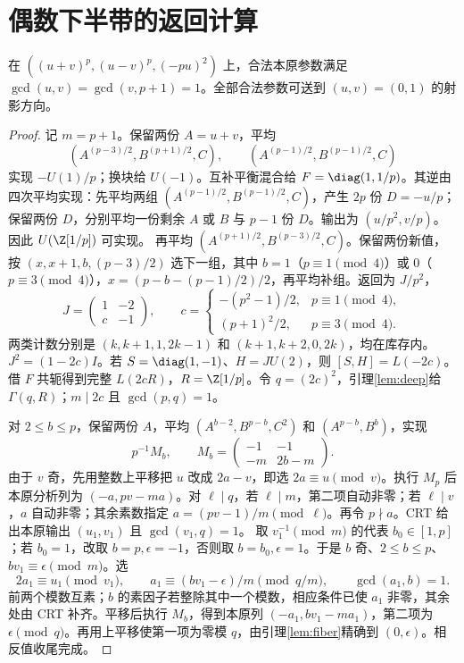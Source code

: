 \appendix
\section{偶数下半带的返回计算}\label{app:lower}
\begin{lemma}\label{lem:two-carrier}
在 $((u+v)^p,(u-v)^p,(-pu)^2)$ 上，合法本原参数满足 $\gcd(u,v)=\gcd(v,p+1)=1$。全部合法参数可送到 $(u,v)=(0,1)$ 的射影方向。
\end{lemma}
\begin{proof}
记 $m=p+1$。保留两份 $A=u+v$，平均
\[(A^{(p-3)/2},B^{(p+1)/2},C),\qquad
(A^{(p-1)/2},B^{(p-1)/2},C)
\]
实现 $-U(1)/p$；换块给 $U(-1)$。互补平衡混合给 $F=\diag(1,1/p)$。其逆由四次平均实现：先平均两组 $(A^{(p-1)/2},B^{(p-1)/2},C)$，产生 $2p$ 份 $D=-u/p$；保留两份 $D$，分别平均一份剩余 $A$ 或 $B$ 与 $p-1$ 份 $D$。输出为 $(u/p^2,v/p)$。因此 $U(\Z[1/p])$ 可实现。
再平均 $(A^{(p+1)/2},B^{(p-3)/2},C)$。保留两份新值，按 $(x,x+1,b,(p-3)/2)$ 选下一组，其中 $b=1$（$p\equiv1\pmod4$）或 $0$（$p\equiv3\pmod4$），$x=(p-b-(p-1)/2)/2$，再平均补组。返回为 $J/p^2$，
\[
J=\begin{pmatrix}1&-2\\c&-1\end{pmatrix},\qquad
c=\begin{cases}-(p^2-1)/2,&p\equiv1\pmod4,\\(p+1)^2/2,&p\equiv3\pmod4.
\end{cases}
\]
两类计数分别是 $(k,k+1,1,2k-1)$ 和 $(k+1,k+2,0,2k)$，均在库存内。$J^2=(1-2c)I$。若 $S=\diag(1,-1)$、$H=JU(2)$，则 $[S,H]=L(-2c)$。借 $F$ 共轭得到完整 $L(2cR)$，$R=\Z[1/p]$。令 $q=(2c)^2$，引理\ref{lem:deep}给 $\Gamma(q,R)$；$m\mid2c$ 且 $\gcd(p,q)=1$。

对 $2\le b\le p$，保留两份 $A$，平均 $(A^{b-2},B^{p-b},C^2)$ 和 $(A^{p-b},B^b)$，实现
\[
p^{-1}M_b,\qquad M_b=\begin{pmatrix}-1&-1\\-m&2b-m\end{pmatrix}.
\]
由于 $v$ 奇，先用整数上平移把 $u$ 改成 $2a-v$，即选 $2a\equiv u\pmod v$。执行 $M_p$ 后本原分析列为 $(-a,pv-ma)$。对 $\ell\mid q$，若 $\ell\mid m$，第二项自动非零；若 $\ell\mid v$，$a$ 自动非零；其余素数指定 $a=(pv-1)/m\pmod\ell$。再令 $p\nmid a$。CRT 给出本原输出 $(u_1,v_1)$ 且 $\gcd(v_1,q)=1$。
取 $v_1^{-1}\pmod m$ 的代表 $b_0\in[1,p]$；若 $b_0=1$，改取 $b=p,\epsilon=-1$，否则取 $b=b_0,\epsilon=1$。于是 $b$ 奇、$2\le b\le p$、$bv_1\equiv\epsilon\pmod m$。选
\[
2a_1\equiv u_1\pmod{v_1},\qquad
a_1\equiv(bv_1-\epsilon)/m\pmod{q/m},\qquad \gcd(a_1,b)=1.
\]
前两个模数互素；$b$ 的素因子若整除其中一个模数，相应条件已使 $a_1$ 非零，其余处由 CRT 补齐。平移后执行 $M_b$，得到本原列 $(-a_1,bv_1-ma_1)$，第二项为 $\epsilon\pmod q$。再用上平移使第一项为零模 $q$，由引理\ref{lem:fiber}精确到 $(0,\epsilon)$。相反值收尾完成。
\end{proof}


